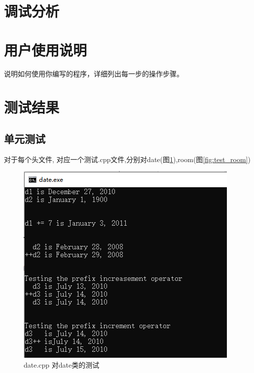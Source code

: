 \documentclass[UTF8]{ctexart}
\begin{document}

\section{调试分析}
\section{用户使用说明}
  说明如何使用你编写的程序，详细列出每一步的操作步骤。
\section{测试结果}
  \subsection{单元测试}
    对于每个头文件, 对应一个测试.cpp文件,分别对date(图\ref{fig:test_date}),room(图\ref{fig:test_room})
    \begin{figure}[H]
      \includegraphics[scale=0.6]{test_date}
      \caption{date.cpp 对date类的测试}
      \label{fig:test_date}
    \end{figure}
\end{document}
